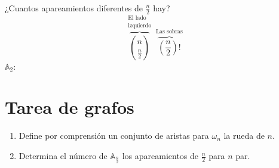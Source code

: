 \documentclass[../main.tex]{subfiles}
\begin{document}
¿Cuantos apareamientos diferentes de $\frac{n}{2}$ hay?
\[
	\overbrace
	{
		\binom{n}{ \frac{n}{2} }
	}^
	{
		\substack
		{
			\text{El lado}\\
			\text{izquierdo}
		}
	}
	\overbrace
	{
		\left(
			\frac{n}{2}
		\right)
		!
	}^
	{
		\substack
		{
			\text{Las sobras}
		}
	}
\]
$\mathbb{A}_2$:

\begin{figure}[H]
	\centering
	
\end{figure}


\begin{figure}[H]
	\centering
	
\end{figure}

\begin{figure}[H]
	\centering
	
\end{figure}

\section{Tarea de grafos}%
\label{sec:tarea_de_grafos}

\begin{enumerate}
	\item Define por comprensión un conjunto de aristas para $\omega_n$
		la rueda de $n$.
	\item Determina el número de $\mathbb{A}_{\frac{n}{2}}$
		los apareamientos de $\frac{n}{2}$ para $n$ par.
\end{enumerate}
\end{document}

